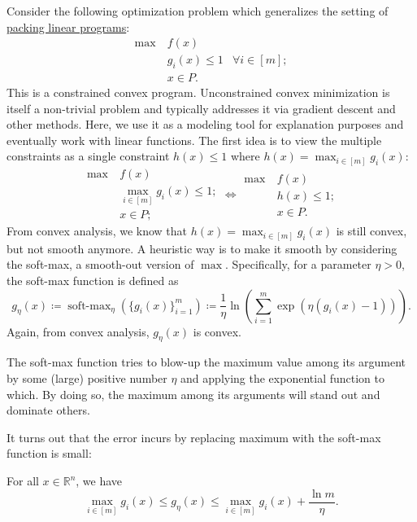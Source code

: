 Consider the following optimization problem which generalizes the setting of \hyperref[def:packing-LP]{packing linear programs}:
\[
	\begin{aligned}
		\max~ & f(x)                                 \\
		      & g_i (x) \leq 1 & \forall i \in [m] ; \\
		      & x\in P.
	\end{aligned}
\]
This is a constrained convex program. Unconstrained convex minimization is itself a non-trivial problem and typically addresses it via gradient descent and other methods. Here, we use it as a modeling tool for explanation purposes and eventually work with linear functions. The first idea is to view the multiple constraints as a single constraint \(h(x) \leq 1\) where \(h(x) = \max _{i \in [m]} g_i(x)\):
\[
	\begin{aligned}
		\max~ & f(x)                               \\
		      & \max _{i \in [m]} g_i (x) \leq 1 ; \\
		      & x\in P;
	\end{aligned}
	\iff \begin{aligned}
		\max~ & f(x)          \\
		      & h(x) \leq 1 ; \\
		      & x\in P.
	\end{aligned}
\]
From convex analysis, we know that \(h(x) = \max _{i \in [m]}g_i(x)\) is still convex, but not smooth anymore. A heuristic way is to make it smooth by considering the soft-max, a smooth-out version of \(\max\). Specifically, for a parameter \(\eta > 0\), the soft-max function is defined as
\[
	g_\eta (x)
	\coloneqq \operatorname{soft-max}_\eta (\{ g_i (x)\}_{i=1}^{m} )
	\coloneqq \frac{1}{\eta } \ln ( \sum_{i=1}^{m} \exp (\eta (g_i(x) - 1 ) )).
\]
Again, from convex analysis, \(g_\eta (x)\) is convex.

\begin{intuition}
	The soft-max function tries to blow-up the maximum value among its argument by some (large) positive number \(\eta \) and applying the exponential function to which. By doing so, the maximum among its arguments will stand out and dominate others.
\end{intuition}

It turns out that the error incurs by replacing maximum with the soft-max function is small:

\begin{claim}
	For all \(x \in \mathbb{R} ^n\), we have
	\[
		\max _{i \in [m]} g_i(x)
		\leq g_\eta (x)
		\leq \max _{i \in [m]} g_i(x) + \frac{\ln m}{\eta }.
	\]
\end{claim}

